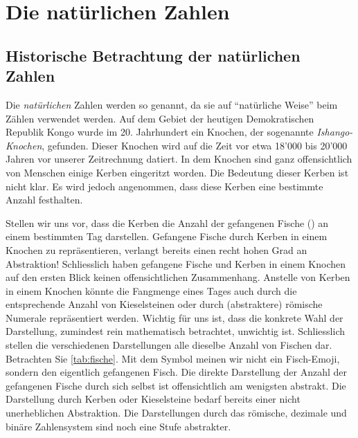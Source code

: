 \chapter{Die natürlichen Zahlen}\label{ch:Kapitel01}
\section{Historische Betrachtung der natürlichen Zahlen}\label{sec:history}
Die \textit{natürlichen} Zahlen werden so genannt, da sie auf \enquote{natürliche Weise} beim Zählen verwendet werden. Auf dem Gebiet der heutigen Demokratischen Republik Kongo wurde im 20. Jahrhundert ein Knochen, der sogenannte \textit{Ishango-Knochen}, gefunden. Dieser Knochen wird auf die Zeit vor etwa 18'000 bis 20'000 Jahren vor unserer Zeitrechnung datiert. In dem Knochen sind ganz offensichtlich von Menschen einige Kerben eingeritzt worden. Die Bedeutung dieser Kerben ist nicht klar. Es wird jedoch angenommen, dass diese Kerben eine bestimmte Anzahl festhalten. 

Stellen wir uns vor, dass die Kerben die Anzahl der gefangenen Fische () an einem bestimmten Tag darstellen. Gefangene Fische durch Kerben in einem Knochen zu repräsentieren, verlangt bereits einen recht hohen Grad an Abstraktion! Schliesslich haben gefangene Fische und Kerben in einem Knochen auf den ersten Blick keinen offensichtlichen Zusammenhang. Anstelle von Kerben in einem Knochen könnte die Fangmenge eines Tages auch durch die entsprechende Anzahl von Kieselsteinen oder durch (abstraktere) römische Numerale repräsentiert werden. Wichtig für uns ist, dass die konkrete Wahl der Darstellung, zumindest rein mathematisch betrachtet, unwichtig ist. Schliesslich stellen die verschiedenen Darstellungen alle dieselbe Anzahl von Fischen dar. Betrachten Sie \cref{tab:fische}. Mit dem Symbol  meinen wir nicht ein Fisch-Emoji, sondern den eigentlich gefangenen Fisch. Die direkte Darstellung der Anzahl der gefangenen Fische durch sich selbst ist offensichtlich am wenigsten abstrakt. Die Darstellung durch Kerben oder Kieselsteine bedarf bereits einer nicht unerheblichen Abstraktion. Die Darstellungen durch das römische, dezimale und binäre Zahlensystem sind noch eine Stufe abstrakter.

